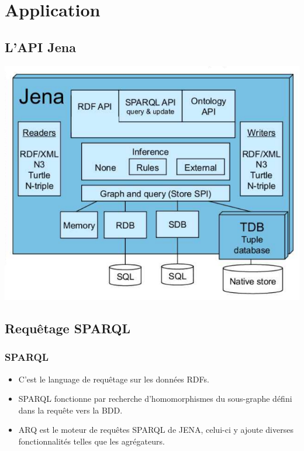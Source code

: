\documentclass[12pt]{beamer}
\begin{document}
\section{Application}

\subsection{L'API Jena}

\begin{frame}
\begin{center}
\includegraphics[scale=0.4]{archi_jena.jpeg} 

\label{fig_jena}
\end{center}



\end{frame}
\subsection{Requêtage SPARQL}

\begin{frame}
\frametitle{SPARQL}
\begin{itemize}
\item C'est le language de requêtage sur les données RDFs.
\item SPARQL fonctionne par recherche d'homomorphismes du sous-graphe défini dans la requête vers la BDD.
\item ARQ est le moteur de requêtes SPARQL de JENA, celui-ci y ajoute diverses fonctionnalités telles que les agrégateurs.
\end{itemize}

\end{frame}
\end{document}
